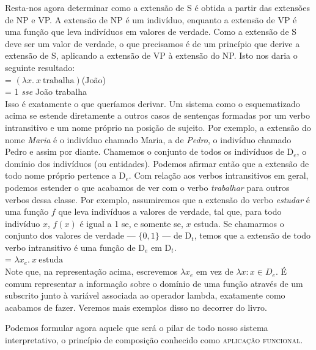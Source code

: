 \noindent Resta-nos agora determinar como a extensão de S é obtida
a partir das extensões de NP e VP. A extensão de NP é um
indivíduo, enquanto a extensão de VP é uma função que leva
indivíduos em valores de verdade. Como a extensão de S deve ser um valor
de verdade, o que precisamos é de um princípio que
derive a extensão de S, aplicando a extensão de VP à extensão do NP. Isto nos daria o seguinte resultado:\\

\n {} = $(\lambda x.\ x\ \text{trabalha})$(João)\\

\n {} = 1 \textit{sse} João trabalha\\

\noindent Isso é exatamente o que queríamos derivar. Um sistema
como o esquematizado acima se estende diretamente a outros casos
de sentenças formadas por um verbo intransitivo e um nome
próprio na posição de sujeito. Por exemplo, a extensão do nome
\textit{Maria} é o indivíduo chamado Maria, a de \textit{Pedro}, o indivíduo
chamado Pedro e assim por diante. Chamemos o conjunto de todos os
indivíduos de D$_{e}$, o domínio dos indivíduos (ou
entidades). Podemos afirmar então que a extensão de todo nome
próprio pertence a D$_{e}$. Com relação aos verbos
intransitivos em geral, podemos estender o que acabamos de ver com
o verbo \textit{trabalhar} para outros verbos dessa classe. Por exemplo,
assumiremos que a extensão do verbo \textit{estudar} é uma função $f$ que
leva indivíduos a valores de verdade, tal que, para todo indivíduo
$x$, $f(x)$ é igual a 1 se, e somente se, $x$
estuda. Se chamarmos o conjunto dos valores de verdade --- $\{0,1\}$ --- de
D$_{t}$, temos que a extensão de todo verbo intransitivo é
uma função de D$_{e}$ em D$_{t}$.\\

\n {} = $\lambda x_{e}.\ x\ \text{estuda}$\\

\n Note que, na representação acima, escrevemos $\lambda x_{e}$
em vez de $\lambda x: x\in D_{e}$. É comum representar a
informação sobre o domínio de uma função através de um
subscrito junto à variável associada ao operador lambda,
exatamente como acabamos de fazer. Veremos mais exemplos disso no decorrer do livro.

Podemos formular agora aquele que será o pilar de todo nosso
sistema interpretativo, o princípio de composição conhecido
como \textsc{aplicação funcional}.\\

